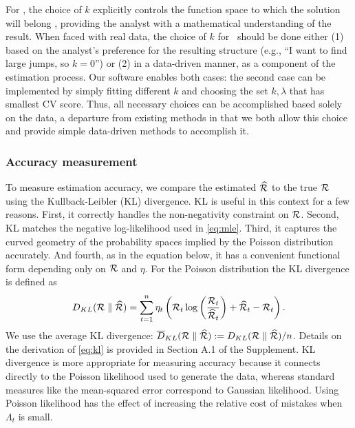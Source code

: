 For \RtEstim, the choice of $k$ explicitly controls the function space to which
the solution will belong \citep{tibshirani2022divided}, providing the analyst
with a mathematical understanding of the result. When faced with real data, the
choice of $k$ for \RtEstim\ should be done either (1) based on the analyst's
preference for the resulting structure (e.g., ``I want to find large jumps, so
$k=0$'') or (2) in a data-driven manner, as a component of the estimation
process.  Our software enables both cases: the second case can be implemented by
simply fitting different $k$ and choosing the set $k,\lambda$ that has smallest
CV score. Thus, all necessary choices can be accomplished based solely on the
data, a departure from existing methods in that we both allow this choice and
provide simple data-driven methods to accomplish it.

\subsubsection{Accuracy measurement}

To measure estimation accuracy, we compare the estimated $\widehat{\mathcal{R}}$ to
the true $\mathcal{R}$ using the Kullback-Leibler (KL) divergence. KL is useful in
this context for a few reasons. First, it correctly handles the non-negativity
constraint on $\mathcal{R}$. Second, KL matches the negative log-likelihood used in
\eqref{eq:mle}. Third, it captures the curved geometry of the probability spaces
implied by the Poisson distribution accurately. And fourth, as in the equation
below, it has a convenient functional form depending only on $\mathcal{R}$ and $\eta$.
For the Poisson distribution the KL divergence is defined as
\begin{equation} \label{eq:kl}
  D_{KL}(\mathcal{R} \parallel \widehat{\mathcal{R}}) = \sum_{t=1}^n \eta_t \left(\mathcal{R}_t
  \log\left(\frac{\mathcal{R}_t} {\widehat{\mathcal{R}}_t}\right) + \widehat{\mathcal{R}}_t -
{\mathcal{R}}_t\right).
\end{equation}
We use the average KL divergence: $\overline{D}_{KL}(\mathcal{R} \parallel
\widehat{\mathcal{R}}) := D_{KL}(\mathcal{R} \parallel \widehat{\mathcal{R}}) / n$. Details on the
derivation of \eqref{eq:kl} is provided in Section A.1 of the Supplement. KL
divergence is more appropriate for measuring accuracy because it connects
directly to the Poisson likelihood used to generate the data, whereas standard
measures like the mean-squared error correspond to Gaussian likelihood. Using
Poisson likelihood has the effect of increasing the relative cost of mistakes
when $\Lambda_t$ is small. 

